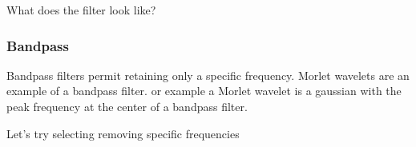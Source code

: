 \documentclass[letterpaper,10pt,english]{sphinxmanual}
\begin{document}
\noindent{}

What does the filter look like?

\begin{sphinxVerbatim}[commandchars=\\\{\}]
  
  
  

       

  
\end{sphinxVerbatim}

\noindent{}


\subsubsection{Bandpass}
\label{\detokenize{content/Signal_Processing:bandpass}}
Bandpass filters permit retaining only a specific frequency. Morlet wavelets are an example of a bandpass filter.  or example a Morlet wavelet is a gaussian with the peak frequency at the center of a bandpass filter.

Let’s try selecting removing specific frequencies
\end{document}
